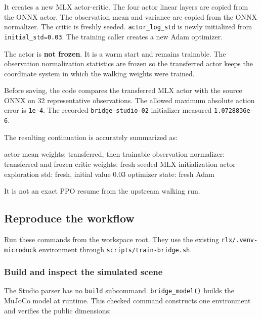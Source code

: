 \documentclass[
  american,
  11pt,
  letterpaper,
]{article}
\newenvironment{Shaded}{\begin{snugshade}}{\end{snugshade}}
\newcommand{\NormalTok}[1]{#1}
\renewenvironment{Shaded}{\par\smallskip}{\par\smallskip}
\begin{document}
It creates a new MLX actor-critic. The four actor linear layers are
copied from the ONNX actor. The observation mean and variance are copied
from the ONNX normalizer. The critic is freshly seeded.
\texttt{actor\_\allowbreak{}log\_\allowbreak{}std} is newly initialized
from \texttt{initial\_std=0.03}. The training caller creates a new Adam
optimizer.

The actor is \textbf{not frozen}. It is a warm start and remains
trainable. The observation normalization statistics are frozen so the
transferred actor keeps the coordinate system in which the walking
weights were trained.

Before saving, the code compares the transferred MLX actor with the
source ONNX on 32 representative observations. The allowed maximum
absolute action error is \texttt{1e-4}. The recorded
\texttt{bridge-\allowbreak{}studio-\allowbreak{}02} initializer measured
\texttt{1.0728836e-6}.

The resulting continuation is accurately summarized as:

\begin{Shaded}
\begin{Highlighting}[]
\NormalTok{actor mean weights:       transferred, then trainable}
\NormalTok{observation normalizer:   transferred and frozen}
\NormalTok{critic weights:           fresh seeded MLX initialization}
\NormalTok{actor exploration std:    fresh, initial value 0.03}
\NormalTok{optimizer state:          fresh Adam}
\end{Highlighting}
\end{Shaded}

It is not an exact PPO resume from the upstream walking run.

\subsection{Reproduce the workflow}\label{reproduce-the-workflow}

Run these commands from the workspace root. They use the existing
\texttt{rlx/\allowbreak{}.venv-\allowbreak{}microduc\allowbreak{}k}
environment through
\texttt{scripts/\allowbreak{}train-\allowbreak{}bridge.s\allowbreak{}h}.

\subsubsection{Build and inspect the simulated
scene}\label{build-and-inspect-the-simulated-scene}

The Studio parser has no \texttt{build} subcommand.
\texttt{bridge\_model()} builds the MuJoCo model at runtime. This
checked command constructs one environment and verifies the public
dimensions:
\end{document}
